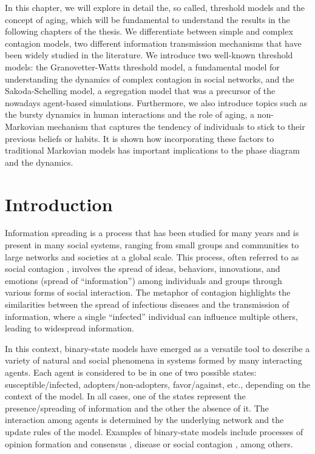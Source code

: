 In this chapter, we will explore in detail the, so called, threshold models and the concept of aging, which will be fundamental to understand the results in the following chapters of the thesis. We differentiate between simple and complex contagion models, two different information transmission mechanisms that have been widely studied in the literature. We introduce two well-known threshold models: the Granovetter-Watts threshold model, a fundamental model for understanding the dynamics of complex contagion in social networks, and the Sakoda-Schelling model, a segregation model that was a precursor of the nowadays agent-based simulations. Furthermore, we also introduce topics such as the bursty dynamics in human interactions and the role of aging, a non-Markovian mechanism that captures the tendency of individuals to stick to their previous beliefs or habits. It is shown how incorporating these factors to traditional Markovian models has important implications to the phase diagram and the dynamics. 

\section{\label{sec:Introduction} Introduction}

Information spreading is a process that has been studied for many years and is present in many social systems, ranging from small groups and communities to large networks and societies at a global scale. This process, often referred to as social contagion \cite{christakis2013social}, involves the spread of ideas, behaviors, innovations, and emotions (spread of ``information'') among individuals and groups through various forms of social interaction. The metaphor of contagion highlights the similarities between the spread of infectious diseases and the transmission of information, where a single ``infected'' individual can influence multiple others, leading to widespread information.

In this context, binary-state models have emerged as a versatile tool to describe a variety of natural and social phenomena in systems formed by many interacting agents. Each agent is considered to be in one of two possible states: susceptible/infected, adopters/non-adopters, favor/against, etc., depending on the context of the model. In all cases, one of the states represent the presence/spreading of information and the other the absence of it. The interaction among agents is determined by the underlying network and the update rules of the model. Examples of binary-state models include processes of opinion formation and consensus \cite{Voter-original,sood-2005,fernandez-gracia-2014,redner-2019}, disease or social contagion \cite{granovetter-1978,pastor-satorras-2015}, among others. 

